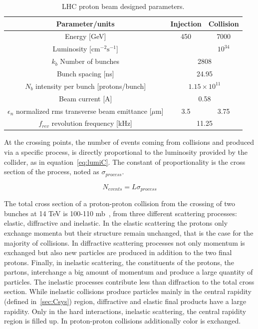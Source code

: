 \begin{table}[htbH]
\begin{center}
\caption{LHC proton beam designed parameters.\label{tab:LHCparams}}
\begin{tabular}{|c|c c|}
\hline 
Parameter/units & Injection & Collision \\
\hline
Energy [GeV]& 450 & 7000 \\ 
Luminosity [$\text{cm}^{-2}\text{s}^{-1}$] & & $10^{34}$ \\
$k_{b}$ Number of bunches & \multicolumn{2}{c|}{2808} \\
Bunch spacing [ns] & \multicolumn{2}{c|}{24.95} \\
$N_{b}$ intensity per bunch [protons/bunch] & \multicolumn{2}{c|}{$1.15\times 10^{11}$} \\
Beam current [A] & \multicolumn{2}{c|}{0.58} \\
$\epsilon_{n}$ normalized rms transverse beam emittance [$\mu$m] & 3.5 & 3.75 \\ 
$f_{rev}$ revolution frequency [kHz] & \multicolumn{2}{c|}{11.25} \\
\hline
\end{tabular}
\end{center}
\end{table}

At the crossing points, the number of events coming from collisions and produced via a specific process, is directly proportional to the luminosity provided by the collider, as in equation~\ref{eq:lumiC}. The constant of proportionality is the cross section of the process, noted as $\sigma_{process}$.

\begin{equation}
  \label{eq:lumiN}
  N_{events}=L\sigma_{process}
\end{equation} %

The total cross section of a proton-proton collision from the crossing of two bunches at 14 TeV is 100-110 mb~\cite{Augier:1993ta}, from three different scattering processes: elastic, diffractive and inelastic. In the elastic scattering the protons only exchange momenta but their structure remain unchanged, that is the case for the majority of collisions. In diffractive scattering processes not only momentum is exchanged but also new particles are produced in addition to the two final protons. Finally, in inelastic scattering, the constituents of the protons, the partons, interchange a big amount of momentum and produce a large quantity of particles. The inelastic processes contribute less than diffraction to the total cross section. While inelastic collisions produce particles mainly in the central rapidity (defined in~\ref{sec:Csys}) region, diffractive and elastic final products have a large rapidity. Only in the hard interactions, inelastic scattering, the central rapidity region is filled up. In proton-proton collisions additionally color is exchanged.

